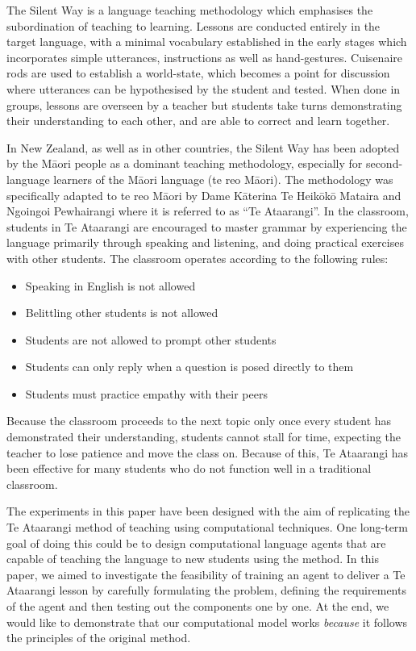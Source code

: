 The Silent Way \cite{gattegno2010teaching} is a language teaching methodology which emphasises the subordination of teaching to learning. Lessons are conducted entirely in the target language, with a minimal vocabulary established in the early stages which incorporates simple utterances, instructions as well as hand-gestures. Cuisenaire rods are used to establish a world-state, which becomes a point for discussion where utterances can be hypothesised by the student and tested. When done in groups, lessons are overseen by a teacher but students take turns demonstrating their understanding to each other, and are able to correct and learn together.

In New Zealand, as well as in other countries, the Silent Way has been adopted by the Māori people as a dominant teaching methodology, especially for second-language learners of the Māori language (te reo Māori). The methodology was specifically adapted to te reo Māori \cite{mataira1980effectiveness,ka2008ngoingoi} by Dame Kāterina Te Heikōkō Mataira and Ngoingoi Pewhairangi where it is referred to as ``Te Ataarangi''. In the classroom, students in Te Ataarangi are encouraged to master grammar by experiencing the language primarily through speaking and listening, and doing practical exercises with other students. The classroom operates according to the following rules:

\begin{itemize}
  \item Speaking in English is not allowed
  \item Belittling other students is not allowed
  \item Students are not allowed to prompt other students
  \item Students can only reply when a question is posed directly to them
  \item Students must practice empathy with their peers
\end{itemize}

Because the classroom proceeds to the next topic only once every student has demonstrated their understanding, students cannot stall for time, expecting the teacher to lose patience and move the class on. Because of this, Te Ataarangi has been effective for many students who do not function well in a traditional classroom.

The experiments in this paper have been designed with the aim of replicating the Te Ataarangi method of teaching using computational techniques. One long-term goal of doing this could be to design computational language agents that are capable of teaching the language to new students using the method. In this paper, we aimed to investigate the feasibility of training an agent to deliver a Te Ataarangi lesson by carefully formulating the problem, defining the requirements of the agent and then testing out the components one by one. At the end, we would like to demonstrate that our computational model works \textit{because} it follows the principles of the original method.


